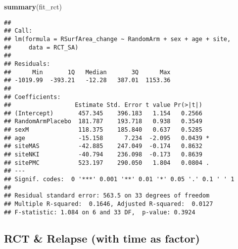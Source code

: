 \documentclass[]{article}
\newenvironment{Shaded}{\begin{snugshade}}{\end{snugshade}}
\newcommand{\KeywordTok}[1]{\textcolor[rgb]{0.13,0.29,0.53}{\textbf{#1}}}
\newcommand{\DataTypeTok}[1]{\textcolor[rgb]{0.13,0.29,0.53}{#1}}
\newcommand{\DecValTok}[1]{\textcolor[rgb]{0.00,0.00,0.81}{#1}}
\newcommand{\StringTok}[1]{\textcolor[rgb]{0.31,0.60,0.02}{#1}}
\newcommand{\CommentTok}[1]{\textcolor[rgb]{0.56,0.35,0.01}{\textit{#1}}}
\newcommand{\OperatorTok}[1]{\textcolor[rgb]{0.81,0.36,0.00}{\textbf{#1}}}
\newcommand{\NormalTok}[1]{#1}
\theoremstyle{definition}
\theoremstyle{definition}
\theoremstyle{definition}
\theoremstyle{remark}
\begin{document}
\begin{Shaded}
\begin{Highlighting}[]
  \KeywordTok{summary}\NormalTok{(fit_rct)}
\end{Highlighting}
\end{Shaded}

\begin{verbatim}
## 
## Call:
## lm(formula = RSurfArea_change ~ RandomArm + sex + age + site, 
##     data = RCT_SA)
## 
## Residuals:
##      Min       1Q   Median       3Q      Max 
## -1019.99  -393.21   -12.28   387.01  1153.36 
## 
## Coefficients:
##                  Estimate Std. Error t value Pr(>|t|)  
## (Intercept)       457.345    396.183   1.154   0.2566  
## RandomArmPlacebo  181.787    193.718   0.938   0.3549  
## sexM              118.375    185.840   0.637   0.5285  
## age               -15.158      7.234  -2.095   0.0439 *
## siteMAS           -42.885    247.049  -0.174   0.8632  
## siteNKI           -40.794    236.098  -0.173   0.8639  
## sitePMC           523.197    290.050   1.804   0.0804 .
## ---
## Signif. codes:  0 '***' 0.001 '**' 0.01 '*' 0.05 '.' 0.1 ' ' 1
## 
## Residual standard error: 563.5 on 33 degrees of freedom
## Multiple R-squared:  0.1646, Adjusted R-squared:  0.0127 
## F-statistic: 1.084 on 6 and 33 DF,  p-value: 0.3924
\end{verbatim}

\subsection{RCT \& Relapse (with time as
factor)}\label{rct-relapse-with-time-as-factor-1}

\begin{Shaded}
\end{Shaded}
\end{document}

